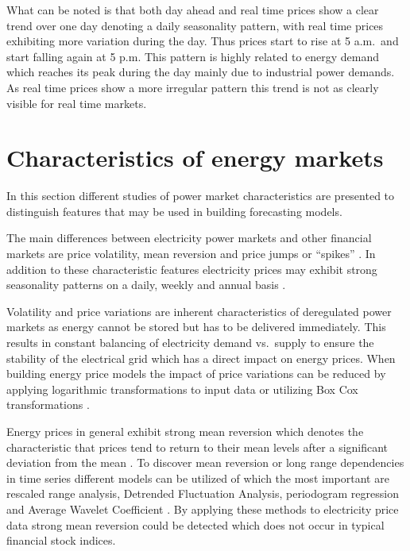 What can be noted is that both day ahead and real time prices show a clear trend over one day denoting a daily seasonality pattern, with real time prices exhibiting more variation during the day. Thus prices start to rise at 5 a.m.~and start falling again at 5 p.m. This pattern is highly related to energy demand which reaches its peak during the day mainly due to industrial power demands. As real time prices show a more irregular pattern this trend is not as clearly visible for real time markets. 




\section{Characteristics of energy markets}

In this section different studies of power market characteristics are presented to distinguish features that may be used in building forecasting models. 


The main differences between electricity power markets and other financial markets are price volatility, mean reversion and price jumps or "`spikes"' \cite{weron2007modeling,weron2008market,weron2004modelingmarkets}. In addition to these characteristic features electricity prices may exhibit strong seasonality patterns on a daily, weekly and annual basis \cite{weron2004modelingmarkets}. 

Volatility and price variations are inherent characteristics of deregulated power markets as energy cannot be stored but has to be delivered immediately. This results in constant balancing of electricity demand vs.~supply to ensure the stability of the electrical grid which has a direct impact on energy prices. When building energy price models the impact of price variations can be reduced by applying logarithmic transformations to input data or utilizing Box Cox transformations \cite{weron2005forecasting, box1964analysis}. 


Energy prices in general exhibit strong mean reversion which denotes the characteristic that prices tend to return to their mean levels after a significant deviation from the mean \cite{weron2004modelingmarkets,weron2007modeling}. To discover mean reversion or long range dependencies in time series different models can be utilized of which the most important are rescaled range analysis, Detrended Fluctuation Analysis, periodogram regression and Average Wavelet Coefficient \cite{weron2007modeling}. By applying these methods to electricity price data strong mean reversion could be detected which does not occur in typical financial stock indices. 


